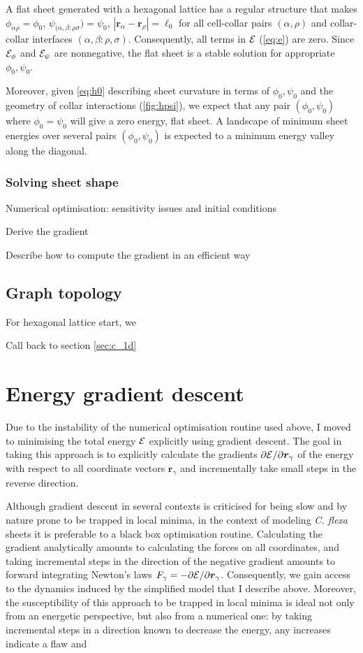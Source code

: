 A flat sheet generated with a hexagonal lattice has a regular structure that makes $\phi_{\alpha\rho} = \phi_0$, $\psi_{(\alpha,\beta:\rho\sigma}) = \psi_0$, $|\bm{r}_\alpha - \bm{r}_\rho| = \ell_0$ for all cell-collar pairs $(\alpha,\rho)$ and collar-collar interfaces $(\alpha,\beta:\rho,\sigma)$. 
Consequently, all terms in $\mathcal{E}$ (\cref{eq:e}) are zero.
Since $\mathcal{E}_\phi$ and $\mathcal{E}_\psi$ are nonnegative, the flat sheet is a stable solution for appropriate $\phi_0, \psi_0$. 

Moreover, given \cref{eq:h0} describing sheet curvature in terms of $\phi_0, \psi_0$ and the geometry of collar interactions (\cref{fig:hpsi}), we expect that any pair $(\phi_0, \psi_0)$ where $\phi_0 = \psi_0$ will give a zero energy, flat sheet.
A landscape of minimum sheet energies over several pairs $(\phi_0, \psi_0)$ is expected to a minimum energy valley along the diagonal.

\subsubsection{Solving sheet shape}

Numerical optimisation: sensitivity issues and initial conditions

Derive the gradient

Describe how to compute the gradient in an efficient way

\subsection{Graph topology}
For hexagonal lattice start, we 

Call back to section \ref{sec:c_1d}

\section{Energy gradient descent}

Due to the instability of the numerical optimisation routine used above, I moved to minimising the total energy $\mathcal{E}$ explicitly using gradient descent. 
The goal in taking this approach is to explicitly calculate the gradients $\partial \mathcal{E} / \partial \bm{r}_\gamma$ of the energy with respect to all coordinate vectors $\bm{r}_\gamma$ and incrementally take small steps in the reverse direction. 

Although gradient descent in several contexts is criticised for being slow and by nature prone to be trapped in local minima, in the context of modeling \textit{C. flexa} sheets it is preferable to a black box optimisation routine. Calculating the gradient analytically amounts to calculating the forces on all coordinates, and taking incremental steps in the direction of the negative gradient amounts to forward integrating Newton's laws $F_\gamma = - \partial\mathcal{E}/\partial\bm{r}_\gamma$. 
Consequently, we gain access to the dynamics induced by the simplified model that I describe above. 
Moreover, the susceptibility of this approach to be trapped in local minima is ideal not only from an energetic perspective, but also from a numerical one: by taking incremental steps in a direction known to decrease the energy, any increases indicate a flaw and 

